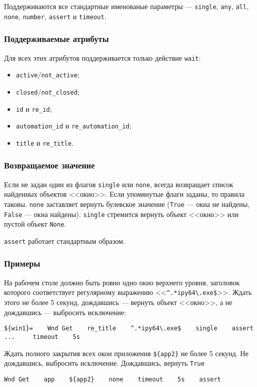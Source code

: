 \documentclass[11pt]{book} %
\begin{document}
Поддерживаются все стандартные именованые параметры --- \verb"single", \verb|any|, \verb|all|, \verb|none|, \verb|number|, \verb"assert" и \verb"timeout".


\subsubsection*{Поддерживаемые атрибуты} 

Для всех этих атрибутов поддерживается только действие \verb|wait|:

\begin{itemize}
\item \verb"active"/\verb"not_active";
\item \verb"closed"/\verb"not_closed";
\item \verb"id" и \verb"re_id";
\item \verb"automation_id" и \verb"re_automation_id";
\item \verb"title" и \verb"re_title".
\end{itemize}

\subsubsection*{Возвращаемое значение}
Если не задан один из флагов \verb"single" или \verb"none", всегда возвращает список найденных объектов <<окно>>. Если упомянутые флаги заданы, то правила таковы. \verb"none" заставляет вернуть булевское значение (\verb"True" --- окна не найдены, \verb"False" --- окна найдены). \verb"single" стремится вернуть объект <<окно>> или пустой объект \verb"None".

\verb"assert" работает стандартным образом.


\subsubsection*{Примеры}
На рабочем столе должно быть ровно одно окно верхнего уровня, заголовок которого соответствует регулярному выражению <<\verb"^.*ipy64\.exe$">>. Ждать этого не более 5 секунд, дождавшись --- вернуть объект <<окно>>, а не дождавшись --- выбросить исключение:

\begin{verbatim}
${win1}=    Wnd Get    re_title    ^.*ipy64\.exe$    single    assert
...     timeout    5s
\end{verbatim}

Ждать полного закрытия всех окон приложения \verb"${app2}" не более 5 секунд. Не дождавшись, выбросить исключение. Дождавшись, вернуть \verb"True"
\begin{verbatim}
Wnd Get    app    ${app2}    none    timeout    5s    assert
\end{verbatim}
\end{document}
